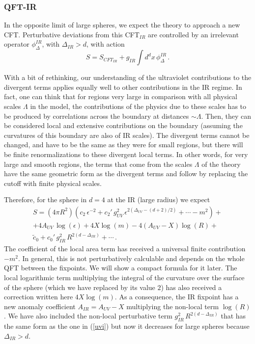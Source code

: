 \documentclass[12pt]{article}
\numberwithin{equation}{section}
\newcommand{\be}{\begin{equation}}
\newcommand{\ee}{\end{equation}}
\begin{document}
\subsubsection*{QFT-IR}
In the opposite limit of large spheres, we expect the theory to approach a new CFT. Perturbative deviations from this CFT$_{IR}$ are controlled by an irrelevant operator $\phi_\Delta^{IR}$, with $\Delta_{IR}> d$, with action
\be
S=S_{CFT_{IR}}+g_{IR} \int d^dx\, \phi^{IR}_\Delta\,. 
\ee

With a bit of rethinking, our understanding of the ultraviolet contributions to the divergent terms applies equally well to other contributions in the IR regime. In fact, one can think that for regions very large in comparison with all physical scales $\Lambda$ in the model,  the contributions of the physics due to these scales has to be produced by correlations across the boundary at distances $\sim\Lambda$. Then, they can be considered local and extensive contributions on the boundary (assuming the curvatures of this boundary are also of IR scales). The divergent terms cannot be changed, and have to be the same as they were for small regions, but there will be finite renormalizations to these divergent local terms. In other words, for very large and smooth regions, the terms that come from the scales $\Lambda$ of the theory have the same geometric form as the divergent terms and follow by replacing the cutoff with finite physical scales.  

Therefore, for the sphere in $d=4$ at the IR (large radius) we expect  
\begin{multline}
S=(4 \pi R^2)\left(c_2 \,\epsilon^{-2}+ c_{2}'\,g_{UV}^2 \,\epsilon^{2 \left(\Delta_{UV} -(d+2)/2\right)}+\cdots -m^2 \right) +
\\
+ 4 A_{UV} \, \log(\epsilon)+4 X \log(m) -4 (A_{UV}-X) \log(R) + \\
\tilde{c}_0 +c_0'\, g_{IR}^2 \, R^{2(d-\Delta_{IR})}+\cdots\,.
\end{multline}
The coefficient of the local area term has received a universal finite contribution $-m^2$. In general, this is not perturbatively calculable and depends on the whole QFT between the fixpoints. We will show a compact formula for it later. The local logarithmic term multiplying the integral of the curvature over the surface of the sphere (which we have replaced by its value $2$) has also received a correction written here $4 X \log(m)$. As a consequence, the IR fixpoint has a new anomaly coefficient $A_{IR}=A_{UV}-X$ multiplying the non-local term $\log(R)$. We have also included the non-local perturbative term $g_{IR}^2 \, R^{2(d-\Delta_{IR})}$ that has the same form as the one in (\ref{uvi}) but now it decreases for large spheres because $\Delta_{IR}>d$.     
\end{document}
